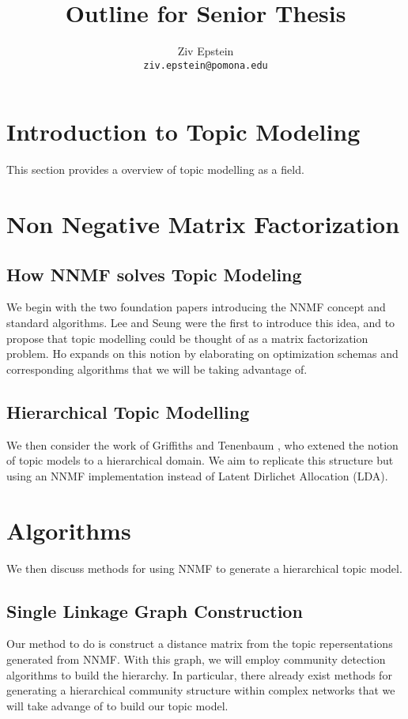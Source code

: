 \documentclass[12pt]{article}
\begin{document}
\nocite{*}

\title{Outline for Senior Thesis}


\author{Ziv Epstein \\ 
	\texttt{ziv.epstein@pomona.edu}}

\maketitle


\section{Introduction to Topic Modeling}
This section provides a overview of topic modelling as a field. 

\section{Non Negative Matrix Factorization}
\subsection{How NNMF solves Topic Modeling}
We begin with the two foundation papers introducing the NNMF concept and standard algorithms. Lee and Seung \cite{lee1999learning} were the first to introduce this idea, and to propose that topic modelling could be thought of as a matrix factorization problem. Ho \cite{ho2008nonnegative} expands on this notion by elaborating on optimization schemas and corresponding algorithms that we will be taking advantage of. 
\subsection{Hierarchical Topic Modelling }
We then consider the work of Griffiths and Tenenbaum \cite{griffiths2004hierarchical}, who extened the notion of topic models to a hierarchical domain. We aim to replicate this structure but using an NNMF implementation instead of Latent Dirlichet Allocation (LDA). 

\section{Algorithms}
We then discuss methods for using NNMF to generate a hierarchical topic model.
\subsection{Single Linkage Graph Construction}
Our method to do is construct a distance matrix from the topic repersentations generated from NNMF. With this graph, we will employ community detection algorithms \cite{fortunato2010community} to build the hierarchy. In particular, there already exist methods for generating a hierarchical community structure within complex networks \cite{lancichinetti2009detecting} that we will take advange of to build our topic model.
\end{document}
